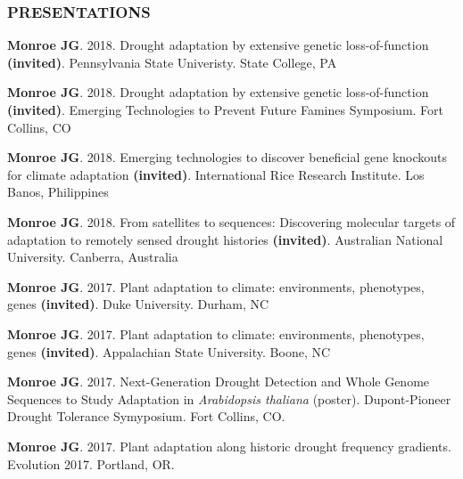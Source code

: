 \documentclass[12pt,english]{article}
\begin{document}
\subsubsection*{PRESENTATIONS}
\vspace{-0.5ex}
\begin{hangparas}{.5in}{1}
\hspace{1em}\textbf{Monroe JG}. 2018. Drought adaptation by extensive genetic loss-of-function \textbf{(invited)}. Pennsylvania State Univeristy. State College, PA
\vspace{0.5ex}\par
\hspace{1em}\textbf{Monroe JG}. 2018. Drought adaptation by extensive genetic loss-of-function \textbf{(invited)}. Emerging Technologies to Prevent Future Famines Symposium. Fort Collins, CO
\vspace{0.5ex}\par
\hspace{1em}\textbf{Monroe JG}. 2018. Emerging technologies to discover beneficial gene knockouts for climate adaptation \textbf{(invited)}. International Rice Research Institute. Los Banos, Philippines
\vspace{0.5ex}\par
\hspace{1em}\textbf{Monroe JG}. 2018. From satellites to sequences: Discovering molecular targets of adaptation to remotely sensed drought histories \textbf{(invited)}. Australian National University. Canberra, Australia
\vspace{0.5ex}\par
\hspace{1em}\textbf{Monroe JG}. 2017. Plant adaptation to climate: environments, phenotypes, genes \textbf{(invited)}. Duke University. Durham, NC
\vspace{0.5ex}\par
\hspace{1em}\textbf{Monroe JG}. 2017. Plant adaptation to climate: environments, phenotypes, genes \textbf{(invited)}. Appalachian State University. Boone, NC
\vspace{0.5ex}\par
\hspace{1em}\textbf{Monroe JG}. 2017. Next-Generation Drought Detection and Whole Genome Sequences to Study Adaptation in \textit{Arabidopsis thaliana} (poster). Dupont-Pioneer Drought Tolerance Symyposium. Fort Collins, CO.
\vspace{0.5ex}\par
\hspace{1em}\textbf{Monroe JG}. 2017. Plant adaptation along historic drought frequency gradients. Evolution 2017. Portland, OR.

\end{hangparas}
\end{document}
